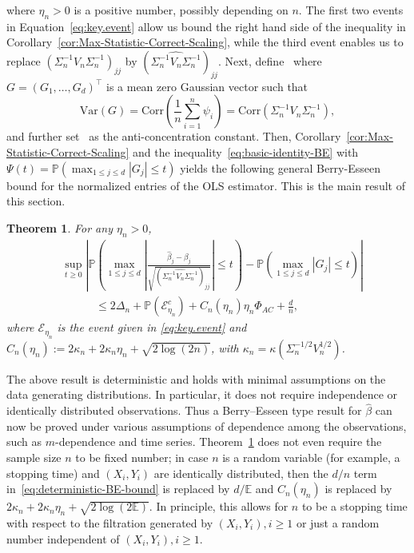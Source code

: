\documentclass{article}
\newtheorem{theorem}{Theorem}
\begin{document}
where $\eta_n>0$ is a positive number, possibly depending on $n$.
The first two
events in Equation~\eqref{eq:key.event} allow us bound the right hand side of the inequality in Corollary~\ref{cor:Max-Statistic-Correct-Scaling}, while the third event enables us to replace $(\Sigma_n^{-1}V_n\Sigma_n^{-1})_{jj}$ by $(\widehat{\Sigma_n^{-1}V_n\Sigma_n^{-1}})_{jj}$.
Next, define
\ where $G = (G_1,\ldots,G_d)^{\top}$ is a mean zero Gaussian vector such that
\begin{equation}\label{eq:cov.G}
\mbox{Var}(G) = \mbox{Corr}\left( \frac{1}{n} \sum_{i=1}^n \psi_i \right) = \mbox{Corr}\left( \Sigma_n^{-1}V_n\Sigma_n^{-1}
\right),
\end{equation}
and further set
\ as the anti-concentration constant.
Then, Corollary~\ref{cor:Max-Statistic-Correct-Scaling} and the inequality~\eqref{eq:basic-identity-BE} with $\Psi(t) = \mathbb{P}(\max_{1\le j\le d}|G_j| \le t)$ yields
the following general Berry-Esseen bound for the normalized entries of the OLS estimator. This is the main result of this section.
\begin{theorem}\label{thm:Berry-Esseen-OLS}
For any $\eta_n > 0$,
\begin{equation}\label{eq:deterministic-BE-bound}
\begin{split}
&\sup_{t\ge0}\left|\mathbb{P}\left(\max_{1\le j\le d}\left|\frac{\widehat{\beta}_j - \beta_j}{\sqrt{(\widehat{\Sigma_n^{-1}V_n\Sigma_n^{-1}})_{jj}}}\right| \le t\right) - \mathbb{P}\left(\max_{1\le j\le d}|G_j| \le t\right)\right|
\\ &\quad\qquad
\le 2\Delta_n + \mathbb{P}(\mathcal{E}_{\eta_n}^c) + C_n(\eta_n)\eta_n\Phi_{AC} + \frac{d}{n},
\end{split}
\end{equation}
where $\mathcal{E}_{\eta_n}$ is the event given in \eqref{eq:key.event} and $C_n(\eta_n) := 2 \kappa_n + 2 \kappa_n \eta_n + \sqrt{2\log(2
n)}$, with $\kappa_n = \kappa(\Sigma_n^{-1/2}V_n^{1/2}) $.
\end{theorem}
The above result is deterministic and holds with minimal assumptions on the data generating distributions. In particular, it does not require independence or identically distributed observations. Thus a Berry--Esseen type result for $\widehat{\beta}$ can now be proved under various assumptions of dependence among the observations, such as $m$-dependence and time series. Theorem~\ref{thm:Berry-Esseen-OLS} does not even require the sample size $n$ to be fixed number; in case $n$ is a random variable (for example, a stopping time) and $(X_i, Y_i)$ are identically distributed, then the $d/n$ term in~\eqref{eq:deterministic-BE-bound} is replaced by $d/\mathbb{E}$ and $C_n(\eta_n)$ is replaced by $2\kappa_n + 2\kappa_n\eta_n + \sqrt{2\log(2\mathbb{E})}$. In principle, this allows for $n$ to be a stopping time with respect to the filtration generated by $(X_i, Y_i), i\ge1$ or just a random number independent of $(X_i, Y_i), i\ge1$.
\end{document}
